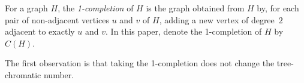 \documentclass[a4paper, cleveref, autoref, thm-restate]{lipics-v2021}
\newcommand{\tw}{{\rm tw}}
\newcommand{\treea}{{\rm tree}\textnormal{-}\alpha}
\newcommand{\treex}{{\rm tree}\textnormal{-}\chi}
\begin{document}

For a graph $H$, the {\it 1-completion} of $H$ is the graph obtained from $H$ by, for each pair of non-adjacent vertices $u$ and $v$ of $H$, adding a new vertex of degree~$2$ adjacent to exactly $u$ and $v$.
In this paper, denote the 1-completion of $H$ by $C(H)$.

The first observation is that taking the 1-completion does not change the tree-chromatic number.

\end{document}
